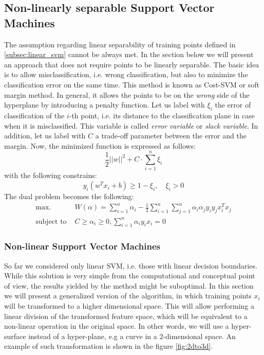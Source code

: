 \subsection{Non-linearly separable Support Vector Machines}
The assumption regarding linear separability of training points defined in \ref{subsec:linear_svm} cannot be always met. In the section below we will present an approach that does not require points to be linearly separable. The basic idea is to allow misclassification, i.e. wrong classification, but also to minimize the classification error on the same time. This method is known as Cost-SVM or soft margin method. In general, it allows the points to be on the \textit{wrong} side of the hyperplane by introducing a penalty function.
Let us label with $\xi_i$ the error of classification of the $i$-th point, i.e. its distance to the classification plane in case when it is misclassified. This variable is called \textit{error variable} or \textit{slack variable}. In addition, let us label with $C$ a trade-off parameter between the error and the margin. Now, the minimized function is expressed as follows:
\begin{equation}
\frac{1}{2}||w||^2 + C \cdot \sum_{i=1}^{n}\xi_i
\end{equation}
with the following constrains:
\begin{equation}
y_i \left(w^Tx_i+b\right) \ge 1-\xi_i, \quad \xi_i>0
\end{equation}
The dual problem becomes the following:
\begin{align*}
\textrm{max. }& W(\alpha) = \sum_{i=1}^{n}\alpha_i-\frac{1}{2}\sum_{i=1}^{n}\sum_{j=1}^{n}\alpha_i\alpha_jy_iy_jx^T_ix_j \\
\textrm{subject to }& C \ge \alpha_i \ge 0, \sum_{i=1}^{n}\alpha_iy_ix_i=0
\end{align*}

\subsubsection{Non-linear Support Vector Machines}
So far we considered only linear SVM, i.e. those with linear decision boundaries. While this solution is very simple from the computational and conceptual point of view, the results yielded by the method might be suboptimal. In this section we will present a generalized version of the algorithm, in which training points $x_i$ will be transformed to a higher dimensional space. This will allow performing a linear division of the transformed feature space, which will be equivalent to a non-linear operation in the original space. In other words, we will use a hyper-surface instead of a hyper-plane, e.g a curve in a 2-dimensional space. An example of such transformation is shown in the figure \ref{fig:2dto3d}.

